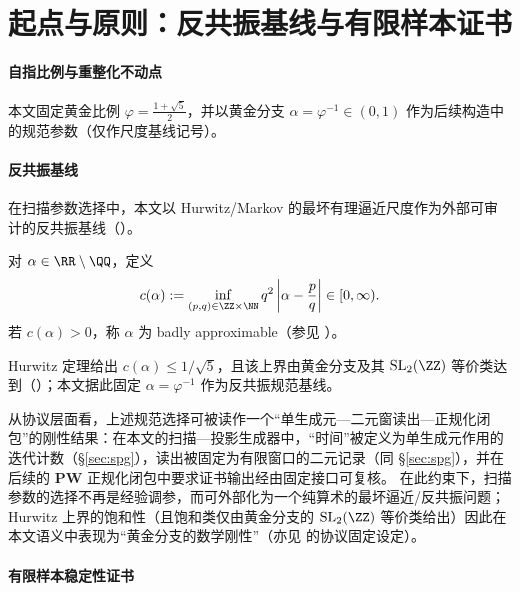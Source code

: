 \section{起点与原则：反共振基线与有限样本证书}\label{sec:principles}

\paragraph{自指比例与重整化不动点}

本文固定黄金比例 \(\varphi=\frac{1+\sqrt5}{2}\)，并以黄金分支 \(\alpha=\varphi^{-1}\in(0,1)\) 作为后续构造中的规范参数（仅作尺度基线记号）。

\paragraph{反共振基线}

在扫描参数选择中，本文以 Hurwitz/Markov 的最坏有理逼近尺度作为外部可审计的反共振基线（\cite{Cassels1957,KuipersNiederreiter1974}）。

\begin{definition}\label{def:markov-constant}
对 $\alpha\in\RR\setminus\QQ$，定义
\[
c(\alpha):=\inf_{(p,q)\in\ZZ\times\NN} q^2\left|\alpha-\frac{p}{q}\right|\in[0,\infty).
\]
若 $c(\alpha)>0$，称 $\alpha$ 为 badly approximable（参见 \cite{Cassels1957,KuipersNiederreiter1974}）。
\end{definition}

Hurwitz 定理给出 \(c(\alpha)\le 1/\sqrt5\)，且该上界由黄金分支及其 \(\mathrm{SL}_2(\ZZ)\) 等价类达到（\cite{Cassels1957,KuipersNiederreiter1974}）；本文据此固定 \(\alpha=\varphi^{-1}\) 作为反共振规范基线。
\par
从协议层面看，上述规范选择可被读作一个“单生成元—二元窗读出—正规化闭包”的刚性结果：在本文的扫描—投影生成器中，“时间”被定义为单生成元作用的迭代计数（\S\ref{sec:spg}），读出被固定为有限窗口的二元记录（同 \S\ref{sec:spg}），并在后续的 \(\mathbf{PW}\) 正规化闭包中要求证书输出经由固定接口可复核。
在此约束下，扫描参数的选择不再是经验调参，而可外部化为一个纯算术的最坏逼近/反共振问题；Hurwitz 上界的饱和性（且饱和类仅由黄金分支的 \(\mathrm{SL}_2(\ZZ)\) 等价类给出）因此在本文语义中表现为“黄金分支的数学刚性”（亦见 \cite{Internal2026POMGenerativeAddressThreeRegisterBridgeRH} 的协议固定设定）。

\paragraph{有限样本稳定性证书}

